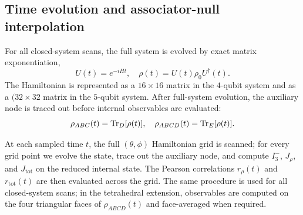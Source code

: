 \documentclass[aps,physrev,preprint,groupedaddress]{revtex4-2}
\begin{document}
\subsection{Time evolution and associator-null interpolation}\label{sm:numerics-evolution-null}

For all closed-system scans, the full system is evolved by exact matrix
exponentiation,
\begin{equation}
    U(t)=e^{-iHt},\quad \rho(t)=U(t)\rho_0U^\dagger(t).
\end{equation}
The Hamiltonian is represented as a $16\times16$ matrix in the $4$-qubit system and as a $(32\times32$ matrix in the $5$-qubit system. After full-system evolution, the auxiliary node is traced out before internal observables are evaluated:
\begin{equation}
    \rho_{ABC}(t)={\rm Tr}_D[\rho(t)], \quad \rho_{ABCD}(t)={\rm Tr}_E[\rho(t)] .
\end{equation}

At each sampled time $t$, the full $(\theta,\phi)$ Hamiltonian grid is scanned; for every grid point we evolve the state, trace out the auxiliary node, and compute $I_3^-$, $J_\rho$, and $J_{\mathrm{tot}}$ on the reduced internal state. The Pearson correlations $r_\rho(t)$ and $r_{\mathrm{tot}}(t)$ are then evaluated across the grid. The same procedure is used for all closed-system scans; in the tetrahedral extension, observables are computed on the four triangular faces of $\rho_{ABCD}(t)$ and face-averaged when required.
\end{document}
